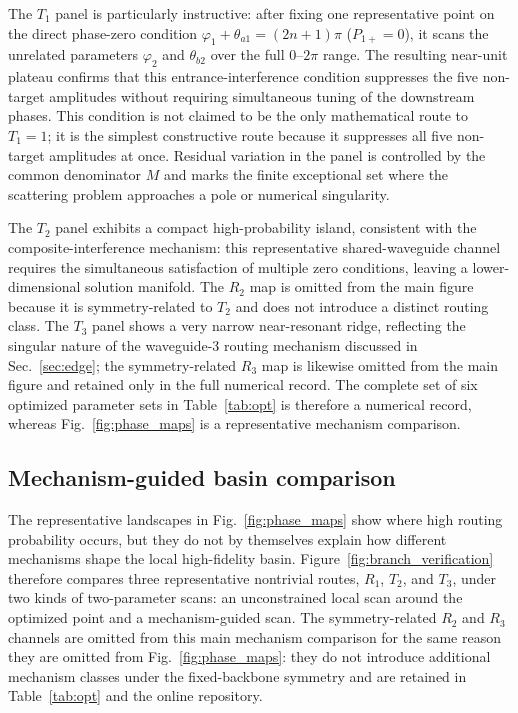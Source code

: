\documentclass[aps,pra,reprint,superscriptaddress,nofootinbib,longbibliography,floatfix]{revtex4-2}
\newcommand{\ph}{\varphi}
\newcommand{\thaone}{\theta_{a1}}
\newcommand{\Poneplus}{P_{1+}}
\begin{document}
The $T_1$ panel is particularly instructive: after fixing one representative point on the direct phase-zero condition $\ph_1+\thaone=(2n+1)\pi$ ($\Poneplus=0$), it scans the unrelated parameters $\varphi_2$ and $\theta_{b2}$ over the full $0$--$2\pi$ range.
The resulting near-unit plateau confirms that this entrance-interference condition suppresses the five non-target amplitudes without requiring simultaneous tuning of the downstream phases.
This condition is not claimed to be the only mathematical route to $T_1=1$; it is the simplest constructive route because it suppresses all five non-target amplitudes at once.
Residual variation in the panel is controlled by the common denominator $M$ and marks the finite exceptional set where the scattering problem approaches a pole or numerical singularity.

The $T_2$ panel exhibits a compact high-probability island, consistent with the composite-interference mechanism: this representative shared-waveguide channel requires the simultaneous satisfaction of multiple zero conditions, leaving a lower-dimensional solution manifold.
The $R_2$ map is omitted from the main figure because it is symmetry-related to $T_2$ and does not introduce a distinct routing class.
The $T_3$ panel shows a very narrow near-resonant ridge, reflecting the singular nature of the waveguide-3 routing mechanism discussed in Sec.~\ref{sec:edge}; the symmetry-related $R_3$ map is likewise omitted from the main figure and retained only in the full numerical record.
The complete set of six optimized parameter sets in Table~\ref{tab:opt} is therefore a numerical record, whereas Fig.~\ref{fig:phase_maps} is a representative mechanism comparison.

\subsection{Mechanism-guided basin comparison}

The representative landscapes in Fig.~\ref{fig:phase_maps} show where high routing probability occurs, but they do not by themselves explain how different mechanisms shape the local high-fidelity basin.
Figure~\ref{fig:branch_verification} therefore compares three representative nontrivial routes, $R_1$, $T_2$, and $T_3$, under two kinds of two-parameter scans: an unconstrained local scan around the optimized point and a mechanism-guided scan.
The symmetry-related $R_2$ and $R_3$ channels are omitted from this main mechanism comparison for the same reason they are omitted from Fig.~\ref{fig:phase_maps}: they do not introduce additional mechanism classes under the fixed-backbone symmetry and are retained in Table~\ref{tab:opt} and the online repository.
\end{document}
